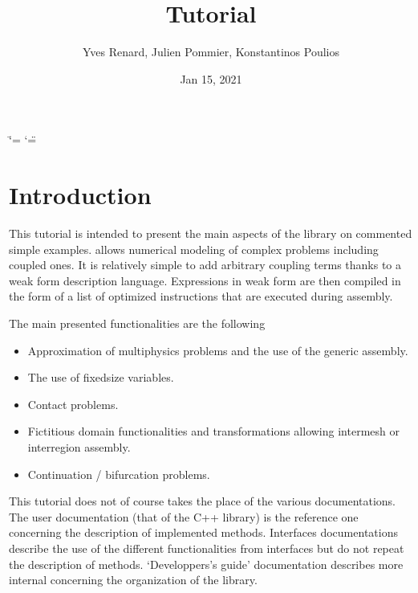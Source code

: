 \documentclass[a4paper,11pt,english]{sphinxmanual}
\title{Tutorial}
\date{Jan 15, 2021}
\author{Yves Renard, Julien Pommier, Konstantinos Poulios}
\begin{document}
\ifdefined\shorthandoff
  \ifnum\catcode`\=\string=\active\shorthandoff{=}\fi
  \ifnum\catcode`\"=\active{}\fi
\fi

\pagestyle{empty}
\sphinxmaketitle
\pagestyle{plain}
\sphinxtableofcontents
\pagestyle{normal}
\label{\detokenize{tutorial/index::doc}}



\chapter{Introduction}
\label{\detokenize{tutorial/intro:introduction}}\label{\detokenize{tutorial/intro:ud-intro-tut}}\label{\detokenize{tutorial/intro::doc}}
This tutorial is intended to present the main aspects of the  library  on commented simple examples.  allows numerical modeling of complex problems including coupled ones. It is relatively simple to add arbitrary coupling terms thanks to a weak form description language. Expressions in weak form are then compiled in the form of a list of optimized instructions that are executed during assembly.

The main presented functionalities are the following
\begin{itemize}
\item {} 
Approximation of multiphysics problems and the use of the generic assembly.

\item {} 
The use of fixed\sphinxhyphen{}size variables.

\item {} 
Contact problems.

\item {} 
Fictitious domain functionalities and transformations allowing inter\sphinxhyphen{}mesh or inter\sphinxhyphen{}region assembly.

\item {} 
Continuation / bifurcation problems.

\end{itemize}

This tutorial does not of course takes the place of the various documentations. The user documentation (that of the C++ library) is the reference one concerning the description of implemented methods. Interfaces documentations describe the use of the different functionalities from interfaces but do not repeat the description of methods. ‘Developpers’s guide’ documentation describes more internal concerning the organization of the library.
\end{document}
